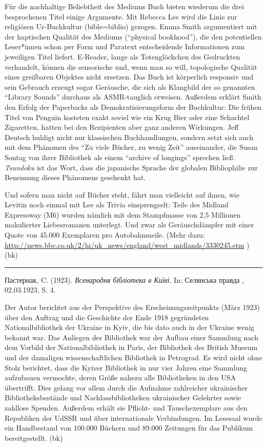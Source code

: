 \documentclass[a4paper,
fontsize=11pt,
oneside,
numbers=noperiodatend,
parskip=half-,
bibliography=totoc,
final
]{scrartcl}
\begin{document}
Für die nachhaltige Beliebtheit des Mediums Buch bieten wiederum die
drei besprochenen Titel einige Argumente. Mit Rebecca Lee wird die Linie
zur religiösen Ur-Buchkultur (bible=biblio) gezogen. Emma Smith
argumentiert mit der haptischen Qualität des Mediums (\enquote{physical
bookhood}), die den potentiellen Leser*innen schon per Form und Paratext
entscheidende Informationen zum jeweiligen Titel liefert. E-Reader,
lange als Totenglöckchen des Gedruckten verhandelt, können die
sensorische und, wenn man so will, topologische Qualität eines
greifbaren Objektes nicht ersetzen. Das Buch ist körperlich responsiv
und sein Gebrauch erzeugt sogar Geräusche, die sich als Klangbild der so
genannten \enquote{Library Sounds} durchaus als ASMR-tauglich erweisen.
Außerdem erklärt Smith den Erfolg der Paperbacks als
Demokratisierungsform der Buchkultur: Die frühen Titel von Penguin
kosteten exakt soviel wie ein Krug Bier oder eine Schachtel Zigaretten,
hatten bei den Rezipienten aber ganz anderen Wirkungen. Jeff Deutsch
huldigt nicht nur klassischen Buchhandlungen, sondern setzt sich auch
mit dem Phänomen des \enquote{Zu viele Bücher, zu wenig Zeit}
auseinander, die Susan Sontag von ihrer Bibliothek als einem
\enquote{archive of longings} sprechen ließ. \emph{Tsundoku} ist das
Wort, dass die japanische Sprache der globalen Bibliophilie zur
Benennung dieses Phänomens geschenkt hat.

Und sofern man nicht auf Bücher steht, fährt man vielleicht auf ihnen,
wie Levitin noch einmal mit Lee als Trivia einsprengselt: Teile des
Midland Expressway (M6) wurden nämlich mit dem Stampfmasse von 2,5
Millionen makulierter Liebesromanen unterlegt. Und zwar als
Geräuschdämpfer mit einer Quote von 45.000 Exemplaren pro Autobahnmeile.
(Mehr dazu:
\url{http://news.bbc.co.uk/2/hi/uk_news/england/west_midlands/3330245.stm}
) (bk)

\begin{center}\rule{0.5\linewidth}{0.5pt}\end{center}
Пастернак, C. 
(1923). 
\emph{Всенародня бібліотека в Київі}.
In:
Селянська правда
, 02.03.1923, S. 4.

Der Autor berichtet aus der Perspektive des Erscheinungszeitpunkts (März
1923) über den Auftrag und die Geschichte der Ende 1918 gegründeten
Nationalbibliothek der Ukraine in Kyiv, die bis dato auch in der Ukraine
wenig bekannt war. Das Anliegen der Bibliothek war der Aufbau einer
Sammlung nach dem Vorbild der Nationalbibliothek in Paris, der
Bibliothek des British Museum und der damaligen wissenschaftlichen
Bibliothek in Petrograd. Es wird nicht ohne Stolz berichtet, dass die
Kyiver Bibliothek in nur vier Jahren eine Sammlung aufzubauen vermochte,
deren Größe nahezu alle Bibliotheken in den USA übertrifft. Dies gelang
vor allem durch die Aufnahme zahlreicher ukrainischer
Bibliotheksbestände und Nachlassbibliotheken ukrainischer Gelehrter
sowie zahllose Spenden. Außerdem erhält sie Pflicht- und Tauschexemplare
aus den Republiken der UdSSR und über internationale Verbindungen. Im
Lesesaal wurde ein Handbestand von 100.000 Büchern und 89.000 Zeitungen
für das Publikum bereitgestellt. (bk)
\end{document}
